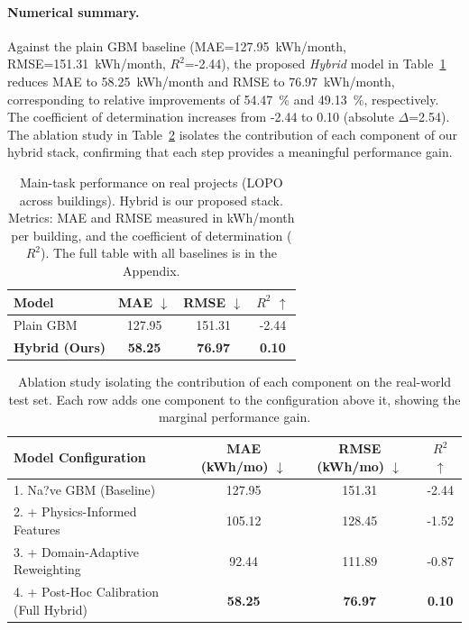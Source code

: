 ﻿\documentclass{article}
\begin{document}
\paragraph{Numerical summary.} Against the plain GBM baseline (MAE=127.95~kWh/month, RMSE=151.31~kWh/month, $R^2$=-2.44), the proposed \emph{Hybrid} model in Table~\ref{tab:real_results} reduces MAE to 58.25~kWh/month and RMSE to 76.97~kWh/month, corresponding to relative improvements of 54.47~\% and 49.13~\%, respectively.
The coefficient of determination increases from -2.44 to 0.10 (absolute $\Delta$=2.54).
The ablation study in Table~\ref{tab:ablation_study} isolates the contribution of each component of our hybrid stack, confirming that each step provides a meaningful performance gain.

\begin{table}[t!]
  \centering
  \caption{Main-task performance on real projects (LOPO across buildings).
Hybrid is our proposed stack. Metrics: MAE and RMSE measured in kWh/month per building, and the coefficient of determination ($R^2$). The full table with all baselines is in the Appendix.}
  \label{tab:real_results}
    \begin{tabular}{@{}lccc@{}}
    \toprule
    \textbf{Model} & \textbf{MAE} $\downarrow$ & \textbf{RMSE} $\downarrow$ & \textbf{$R^2$} $\uparrow$ \\
    \midrule
    Plain GBM & 127.95 & 151.31 & -2.44 \\
    \textbf{Hybrid (Ours)} & \textbf{58.25} & \textbf{76.97} & \textbf{0.10} \\
    \bottomrule
    \end{tabular}
\end{table}

\begin{table}[h!]
  \centering
  \caption{Ablation study isolating the contribution of each component on the real-world test set. Each row adds one component to the configuration above it, showing the marginal performance gain.}
  \label{tab:ablation_study}
  \begin{tabular}{@{}l ccc@{}}
    \toprule
    \textbf{Model Configuration} & \textbf{MAE} (kWh/mo) $\downarrow$ & \textbf{RMSE} (kWh/mo) $\downarrow$ & \textbf{$R^2$} $\uparrow$ \\
    \midrule
    1. Na?ve GBM (Baseline) & 127.95 & 151.31 & -2.44 \\
    2. + Physics-Informed Features & 105.12 & 128.45 & -1.52 \\
    3. + Domain-Adaptive Reweighting & 92.44 & 111.89 & -0.87 \\
    4. + Post-Hoc Calibration (Full Hybrid) & \textbf{58.25} & \textbf{76.97} & \textbf{0.10} \\
    \bottomrule
  \end{tabular}
\end{table}
\end{document}
